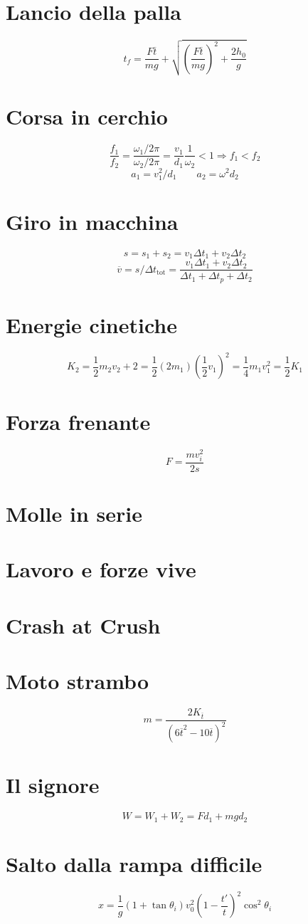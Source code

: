 
\section{Lancio della palla}

\[ t_f = \frac{F\overline{t}}{mg} + \sqrt{\left( \frac{F\overline{t}}{mg} \right)^2 + \frac{2h_0}{g}} \]


\section{Corsa in cerchio}

\[ \frac{f_1}{f_2} = \frac{\omega_1/2\pi}{\omega_2/2\pi} = \frac{v_1}{d_1}\frac{1}{\omega_2} < 1 \Rightarrow f_1 < f_2\]
\[ a_1 = v_1^2/d_1 \qquad a_2 = \omega^2 d_2 \]


\section{Giro in macchina}
\[ s = s_1 + s_2 = v_1\Delta t_1 + v_2 \Delta t_2 \]
\[ \overline{v} = s/\Delta t_\text{tot} = \frac{v_1\Delta t_1 + v_2 \Delta t_2}{\Delta t_1 + \Delta t_p + \Delta t_2} \]


\section{Energie cinetiche}
\[ K_2 = \frac12 m_2 v_2+2 = \frac12 (2m_1)\left(\frac12 v_1\right)^2 = \frac14 m_1v_1^2 = \frac12 K_1 \]


\section{Forza frenante}

\[ F = \frac{mv_i^2}{2s} \]


\section{Molle in serie}

\section{Lavoro e forze vive}

\section{Crash at Crush}

\section{Moto strambo}

\[ m = \frac{2K_{\overline{t}}}{(6\overline{t}^2 - 10\overline{t})^2} \]

\section{Il signore}

\[ W = W_1 + W_2 = Fd_1 + mgd_2 \]


\section{Salto dalla rampa difficile}

\[ x = \frac{1}{g}(1 + \tan\theta_i)v_0^2\left(1 - \frac{t'}{t}\right)^2 \cos^2\theta_i \]